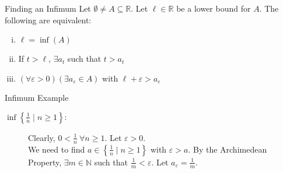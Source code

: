 \documentclass[10pt]{extarticle}
\newcommand{\N}{\mathbb{N}}
\newcommand{\R}{\mathbb{R}}
\begin{document}
  \begin{problem}{Finding an Infimum}
    Let $\emptyset \neq A \subseteq \R$. Let $\ell \in \R$ be a lower bound for $A$. The following are equivalent:
    \begin{enumerate}[(i)]
      \item $\ell = \inf(A)$
      \item If $t > \ell$, $\exists a_t$ such that $t > a_t$
      \item $(\forall \varepsilon > 0)(\exists a_{\varepsilon}\in A)$ with $\ell + \varepsilon > a_{\varepsilon}$
    \end{enumerate}
  \end{problem}
  \begin{problem}{Infimum Example}
    \begin{description}
      \item[$\inf\left\{\frac{1}{n}\mid n\geq 1\right\}:$] Clearly, $0 < \frac{1}{n}~\forall n \geq 1$. Let $\varepsilon > 0$.\\

        We need to find $a\in\left\{\frac{1}{n}\mid n\geq 1\right\}$ with $\varepsilon > a$. By the Archimedean Property, $\exists m\in\N$ such that $\frac{1}{m} < \varepsilon$. Let $a_{\varepsilon} = \frac{1}{m}$.
    \end{description}
  \end{problem}
\end{document}
